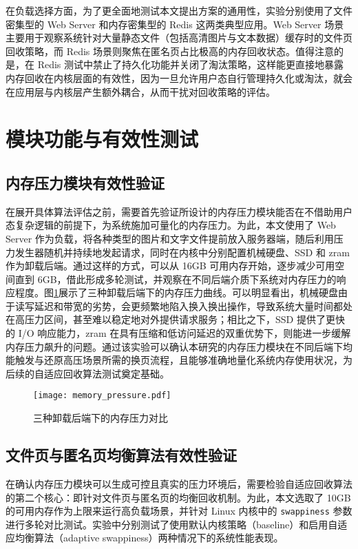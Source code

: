 在负载选择方面，为了更全面地测试本文提出方案的通用性，实验分别使用了文件密集型的 Web Server 和内存密集型的 Redis 这两类典型应用。Web Server 场景主要用于观察系统针对大量静态文件（包括高清图片与文本数据）缓存时的文件页回收策略，而 Redis 场景则聚焦在匿名页占比极高的内存回收状态。值得注意的是，在 Redis 测试中禁止了持久化功能并关闭了淘汰策略，这样能更直接地暴露内存回收在内核层面的有效性，因为一旦允许用户态自行管理持久化或淘汰，就会在应用层与内核层产生额外耦合，从而干扰对回收策略的评估。

\section{模块功能与有效性测试}

\subsection{内存压力模块有效性验证}

在展开具体算法评估之前，需要首先验证所设计的内存压力模块能否在不借助用户态复杂逻辑的前提下，为系统施加可量化的内存压力。为此，本文使用了 Web Server 作为负载，将各种类型的图片和文字文件提前放入服务器端，随后利用压力发生器随机并持续地发起请求，同时在内核中分别配置机械硬盘、SSD 和 zram 作为卸载后端。通过这样的方式，可以从 16GB 可用内存开始，逐步减少可用空间直到 6GB，借此形成多轮测试，并观察在不同后端介质下系统对内存压力的响应程度。图\ref{fig:memory_pressure}展示了三种卸载后端下的内存压力曲线。可以明显看出，机械硬盘由于读写延迟和带宽的劣势，会更频繁地陷入换入换出操作，导致系统大量时间都处在高压力区间，甚至难以稳定地对外提供请求服务；相比之下，SSD 提供了更快的 I/O 响应能力，zram 在具有压缩和低访问延迟的双重优势下，则能进一步缓解内存压力飙升的问题。通过该实验可以确认本研究的内存压力模块在不同后端下均能触发与还原高压场景所需的换页流程，且能够准确地量化系统内存使用状况，为后续的自适应回收算法测试奠定基础。

\begin{figure}[htbp]
    \centering
    \texttt{[image: memory\_pressure.pdf]}
    \caption{三种卸载后端下的内存压力对比}
    \label{fig:memory_pressure}
\end{figure}


\subsection{文件页与匿名页均衡算法有效性验证}
\label{sec:file_page_anonymous_page_balance_algorithm_validation}

在确认内存压力模块可以生成可控且真实的压力环境后，需要检验自适应回收算法的第二个核心：即针对文件页与匿名页的均衡回收机制。为此，本文选取了 10GB 的可用内存作为上限来运行高负载场景，并针对 Linux 内核中的 \texttt{swappiness} 参数进行多轮对比测试。实验中分别测试了使用默认内核策略（baseline）和启用自适应均衡算法（adaptive  swappiness）两种情况下的系统性能表现。

